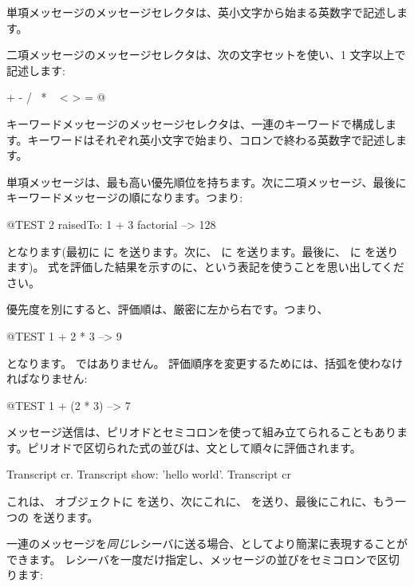 \documentclass[a4paper,10pt,twoside]{book}
\begin{document}
単項メッセージのメッセージセレクタは、英小文字から始まる英数字で記述します。

二項メッセージのメッセージセレクタは、次の文字セットを使い、1 文字以上で記述します:
\begin{code}{}
+ - / \ * ~ < > = @ %
\end{code}
\noindent
キーワードメッセージのメッセージセレクタは、一連のキーワードで構成します。キーワードはそれぞれ英小文字で始まり、コロンで終わる英数字で記述します。

単項メッセージは、最も高い優先順位を持ちます。次に二項メッセージ、最後にキーワードメッセージの順になります。つまり:
\begin{code}{@TEST}
2 raisedTo: 1 + 3 factorial --> 128
\end{code}
となります(最初に  に  を送ります。次に、 に  を送ります。最後に、 に  を送ります)。
式を評価した結果を示すのに、\ct{-->}という表記を使うことを思い出してください。

優先度を別にすると、評価順は、厳密に左から右です。つまり、
\begin{code}{@TEST}
1 + 2 * 3 --> 9
\end{code}
となります。 ではありません。
評価順序を変更するためには、括弧を使わなければなりません:
\begin{code}{@TEST}
1 + (2 * 3) --> 7
\end{code}

メッセージ送信は、ピリオドとセミコロンを使って組み立てられることもあります。ピリオドで区切られた式の並びは、文として順々に評価されます。

\begin{code}{}
Transcript cr.
Transcript show: 'hello world'.
Transcript cr
\end{code}

\noindent
これは、 オブジェクトに  を送り、次にこれに、 を送り、最後にこれに、もう一つの  を送ります。

一連のメッセージを\emph{同じ}レシーバに送る場合、としてより簡潔に表現することができます。
レシーバを一度だけ指定し、メッセージの並びをセミコロンで区切ります:
\end{document}
